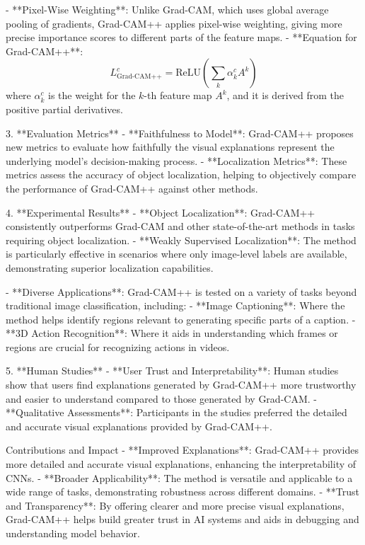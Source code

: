 - **Pixel-Wise Weighting**: Unlike Grad-CAM, which uses global average pooling of gradients, Grad-CAM++ applies pixel-wise weighting, giving more precise importance scores to different parts of the feature maps.
  - **Equation for Grad-CAM++**: 
    \[
    L_{\text{Grad-CAM++}}^c = \text{ReLU} \left( \sum_k \alpha_k^c A^k \right)
    \]
    where \(\alpha_k^c\) is the weight for the \(k\)-th feature map \(A^k\), and it is derived from the positive partial derivatives.

 3. **Evaluation Metrics**
- **Faithfulness to Model**: Grad-CAM++ proposes new metrics to evaluate how faithfully the visual explanations represent the underlying model's decision-making process.
  - **Localization Metrics**: These metrics assess the accuracy of object localization, helping to objectively compare the performance of Grad-CAM++ against other methods.

 4. **Experimental Results**
- **Object Localization**: Grad-CAM++ consistently outperforms Grad-CAM and other state-of-the-art methods in tasks requiring object localization.
  - **Weakly Supervised Localization**: The method is particularly effective in scenarios where only image-level labels are available, demonstrating superior localization capabilities.

- **Diverse Applications**: Grad-CAM++ is tested on a variety of tasks beyond traditional image classification, including:
  - **Image Captioning**: Where the method helps identify regions relevant to generating specific parts of a caption.
  - **3D Action Recognition**: Where it aids in understanding which frames or regions are crucial for recognizing actions in videos.

 5. **Human Studies**
- **User Trust and Interpretability**: Human studies show that users find explanations generated by Grad-CAM++ more trustworthy and easier to understand compared to those generated by Grad-CAM.
  - **Qualitative Assessments**: Participants in the studies preferred the detailed and accurate visual explanations provided by Grad-CAM++.

Contributions and Impact
- **Improved Explanations**: Grad-CAM++ provides more detailed and accurate visual explanations, enhancing the interpretability of CNNs.
- **Broader Applicability**: The method is versatile and applicable to a wide range of tasks, demonstrating robustness across different domains.
- **Trust and Transparency**: By offering clearer and more precise visual explanations, Grad-CAM++ helps build greater trust in AI systems and aids in debugging and understanding model behavior.

